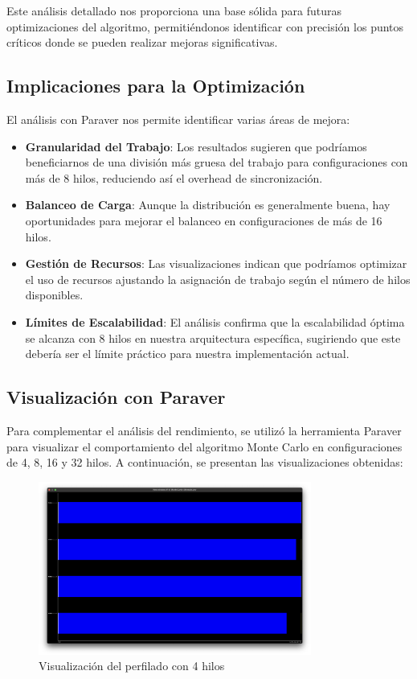 \documentclass[a4paper, 10pt, onecolumn]{IEEEtran}
\begin{document}
Este análisis detallado nos proporciona una base sólida para futuras optimizaciones del algoritmo, permitiéndonos identificar con precisión los puntos críticos donde se pueden realizar mejoras significativas.

\subsection{Implicaciones para la Optimización}
El análisis con Paraver nos permite identificar varias áreas de mejora:

\begin{itemize}
  \item \textbf{Granularidad del Trabajo}: Los resultados sugieren que podríamos beneficiarnos de una división más gruesa del trabajo para configuraciones con más de 8 hilos, reduciendo así el overhead de sincronización.
  
  \item \textbf{Balanceo de Carga}: Aunque la distribución es generalmente buena, hay oportunidades para mejorar el balanceo en configuraciones de más de 16 hilos.
  
  \item \textbf{Gestión de Recursos}: Las visualizaciones indican que podríamos optimizar el uso de recursos ajustando la asignación de trabajo según el número de hilos disponibles.
  
  \item \textbf{Límites de Escalabilidad}: El análisis confirma que la escalabilidad óptima se alcanza con 8 hilos en nuestra arquitectura específica, sugiriendo que este debería ser el límite práctico para nuestra implementación actual.
\end{itemize}

\subsection{Visualización con Paraver}

Para complementar el análisis del rendimiento, se utilizó la herramienta Paraver \cite{paraver} para visualizar el comportamiento del algoritmo Monte Carlo en configuraciones de 4, 8, 16 y 32 hilos. A continuación, se presentan las visualizaciones obtenidas:

\begin{figure}[H]
  \centering
  \includegraphics[width=0.8\textwidth]{./img/paraver-4threads.png}
  \caption{Visualización del perfilado con 4 hilos}
  \label{fig:paraver_4threads}
\end{figure}
\end{document}
